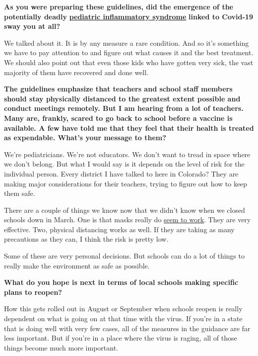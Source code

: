 \textbf{As you were preparing these guidelines, did the emergence of the
potentially deadly}
\textbf{\href{https://www.nytimes3xbfgragh.onion/2020/06/29/well/family/caring-for-children-with-multisystem-inflammatory-syndrome.html}{pediatric
inflammatory syndrome}} \textbf{linked to Covid-19 sway you at all?}

We talked about it. It is by any measure a rare condition. And so it's
something we have to pay attention to and figure out what causes it and
the best treatment. We should also point out that even those kids who
have gotten very sick, the vast majority of them have recovered and done
well.

\textbf{The guidelines emphasize that teachers and school staff members
should stay physically distanced to the greatest extent possible and
conduct meetings remotely. But I am hearing from a lot of teachers. Many
are, frankly, scared to go back to school before a vaccine is available.
A few have told me that they feel that their health is treated as
expendable. What's your message to them?}

We're pediatricians. We're not educators. We don't want to tread in
space where we don't belong. But what I would say is it depends on the
level of risk for the individual person. Every district I have talked to
here in Colorado? They are making major considerations for their
teachers, trying to figure out how to keep them safe.

There are a couple of things we know now that we didn't know when we
closed schools down in March. One is that masks really do
\href{https://www.thelancet.com/journals/lancet/article/PIIS0140-6736(20)31142-9/fulltext}{seem
to work}. They are very effective. Two, physical distancing works as
well. If they are taking as many precautions as they can, I think the
risk is pretty low.

Some of these are very personal decisions. But schools can do a lot of
things to really make the environment as safe as possible.

\textbf{What do you hope is next in terms of local schools making
specific plans to reopen?}

How this gets rolled out in August or September when schools reopen is
really dependent on what is going on at that time with the virus. If
you're in a state that is doing well with very few cases, all of the
measures in the guidance are far less important. But if you're in a
place where the virus is raging, all of those things become much more
important.

